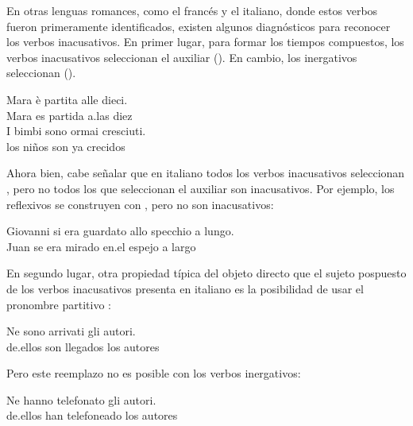 \begin{recuadro}
En otras lenguas romances, como el francés y el italiano, donde estos verbos
fueron primeramente identificados, existen algunos diagnósticos para reconocer
los verbos inacusativos. En primer lugar, para formar los tiempos compuestos,
los verbos inacusativos seleccionan el auxiliar 
(). En cambio, los inergativos seleccionan 
().

\begin{exe}
  \ex \gll Mara è partita alle dieci.\\
           Mara es partida a.las diez\\
      \glt {}
  \ex \gll I bimbi sono ormai cresciuti.\\
           los niños son ya crecidos\\
      \glt {}
\end{exe}

Ahora bien, cabe señalar que en italiano todos los verbos inacusativos
seleccionan , pero no todos los que seleccionan el auxiliar
 son inacusativos. Por ejemplo, los reflexivos se construyen con
, pero no son inacusativos:

\begin{exe}
  \ex \gll Giovanni si era guardato allo specchio a lungo.\\
           Juan se era mirado en.el espejo a largo\\
      \glt {}
\end{exe}

En segundo lugar, otra propiedad típica del objeto directo que el sujeto
pospuesto de los verbos inacusativos presenta en italiano es la posibilidad de
usar el pronombre partitivo :

\begin{exe}
  \ex \gll Ne sono arrivati gli autori.\\
           de.ellos son llegados los autores\\
      \glt {}
\end{exe}

Pero este reemplazo no es posible con los verbos inergativos:

\begin{exe}
  \ex \gll {*}Ne hanno telefonato gli autori.\\
           de.ellos han telefoneado los autores\\
      \glt {}
\end{exe}


\end{recuadro}
